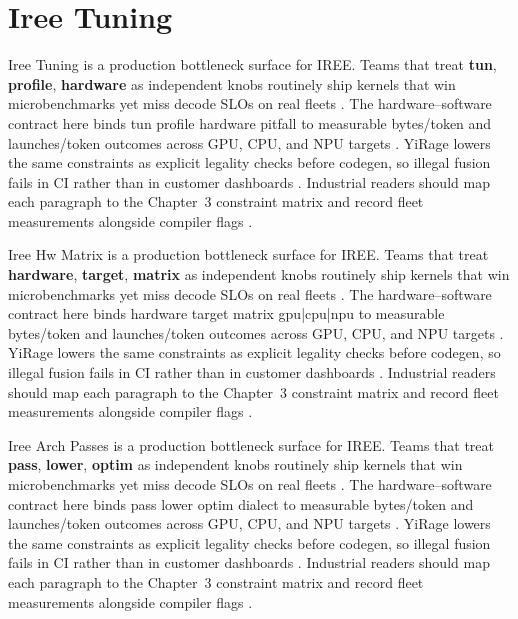 \section{Iree Tuning}
\label{sec:iree_tuning}

Iree Tuning is a production bottleneck surface for IREE. Teams that treat \textbf{tun}, \textbf{profile}, \textbf{hardware} as independent knobs routinely ship kernels that win microbenchmarks yet miss decode SLOs on real fleets \citep{nvidia2022hopper,amd2024aie}. The hardware--software contract here binds tun profile hardware pitfall to measurable bytes/token and launches/token outcomes across GPU, CPU, and NPU targets \citep{semianalysis2024tma,dlbook}. YiRage lowers the same constraints as explicit legality checks before codegen, so illegal fusion fails in CI rather than in customer dashboards \citep{amd2024xdna,dao2022flashattention}. Industrial readers should map each paragraph to the Chapter~3 constraint matrix and record fleet measurements alongside compiler flags \citep{amd2024aie,kwon2023vllm}.

Iree Hw Matrix is a production bottleneck surface for IREE. Teams that treat \textbf{hardware}, \textbf{target}, \textbf{matrix} as independent knobs routinely ship kernels that win microbenchmarks yet miss decode SLOs on real fleets \citep{taxbreak2026,semianalysis2024tma}. The hardware--software contract here binds hardware target matrix gpu|cpu|npu to measurable bytes/token and launches/token outcomes across GPU, CPU, and NPU targets \citep{memoryfloor2026,amd2024xdna}. YiRage lowers the same constraints as explicit legality checks before codegen, so illegal fusion fails in CI rather than in customer dashboards \citep{nvidia2022hopper,amd2024aie}. Industrial readers should map each paragraph to the Chapter~3 constraint matrix and record fleet measurements alongside compiler flags \citep{semianalysis2024tma,dlbook}.

Iree Arch Passes is a production bottleneck surface for IREE. Teams that treat \textbf{pass}, \textbf{lower}, \textbf{optim} as independent knobs routinely ship kernels that win microbenchmarks yet miss decode SLOs on real fleets \citep{memoryfloor2026,amd2024xdna}. The hardware--software contract here binds pass lower optim dialect to measurable bytes/token and launches/token outcomes across GPU, CPU, and NPU targets \citep{nvidia2022hopper,amd2024aie}. YiRage lowers the same constraints as explicit legality checks before codegen, so illegal fusion fails in CI rather than in customer dashboards \citep{semianalysis2024tma,dlbook}. Industrial readers should map each paragraph to the Chapter~3 constraint matrix and record fleet measurements alongside compiler flags \citep{amd2024xdna,dao2022flashattention}.

